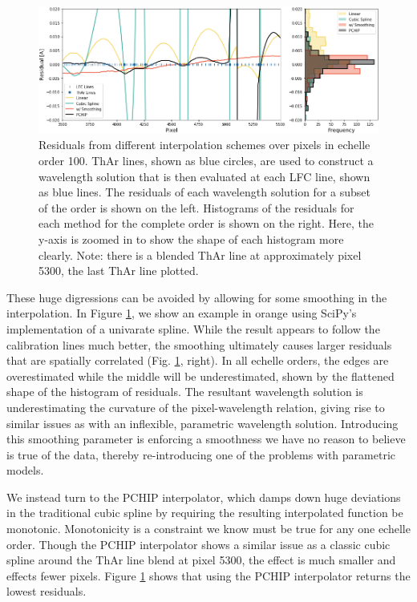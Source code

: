\documentclass[modern]{aastex63}
\begin{document}
\begin{figure}[t]
\centering
\includegraphics[width=\textwidth]{Figures/intpx_tests.png}
\caption{Residuals from different interpolation schemes over pixels in echelle order 100.  ThAr lines, shown as blue circles, are used to construct a wavelength solution that is then evaluated at each LFC line, shown as blue lines.  The residuals of each wavelength solution for a subset of the order is shown on the left.  Histograms of the residuals for each method for the complete order is shown on the right.  Here, the y-axis is zoomed in to show the shape of each histogram more clearly.  Note: there is a blended ThAr line at approximately pixel 5300, the last ThAr line plotted.}
\label{fig:xinterp}
\end{figure} 

These huge digressions can be avoided by allowing for some smoothing in the interpolation.  In Figure \ref{fig:xinterp}, we show an example in orange using SciPy's implementation of a univarate spline.  While the result appears to follow the calibration lines much better, the smoothing ultimately causes larger residuals that are spatially correlated (Fig. \ref{fig:xinterp}, right).  In all echelle orders, the edges are overestimated while the middle will be underestimated, shown by the flattened shape of the histogram of residuals.  The resultant wavelength solution is underestimating the curvature of the pixel-wavelength relation, giving rise to similar issues as with an inflexible, parametric wavelength solution.  Introducing this smoothing parameter is enforcing a smoothness we have no reason to believe is true of the data, thereby re-introducing one of the problems with parametric models.

We instead turn to the PCHIP interpolator, which damps down huge deviations in the traditional cubic spline by requiring the resulting interpolated function be monotonic.  Monotonicity is a constraint we know must be true for any one echelle order.  Though the PCHIP interpolator shows a similar issue as a classic cubic spline around the ThAr line blend at pixel 5300, the effect is much smaller and effects fewer pixels.  Figure \ref{fig:xinterp} shows that using the PCHIP interpolator returns the lowest residuals.  
\end{document}

